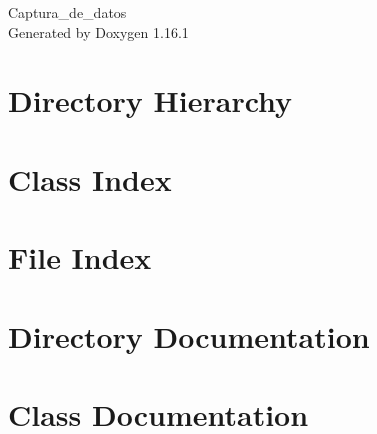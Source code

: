 \documentclass[twoside]{book}
\newcommand{\+}{\discretionary{\mbox{\scriptsize$\hookleftarrow$}}{}{}}
\newcommand{\clearemptydoublepage}{%
    \newpage{\pagestyle{empty}\cleardoublepage}%
  }
\begin{document}
  \raggedbottom
    \hypersetup{pageanchor=false,
                bookmarksnumbered=true,
                pdfencoding=unicode
               }
  \begin{titlepage}
  \vspace*{7cm}
  \begin{center}%
  {\Large Captura\+\_\+de\+\_\+datos}\\
  \vspace*{1cm}
  {\large Generated by Doxygen 1.16.1}\\
  \end{center}
  \end{titlepage}
  \clearemptydoublepage
  \tableofcontents
  \clearemptydoublepage
  \hypersetup{pageanchor=true}
\chapter{Directory Hierarchy}

\chapter{Class Index}

\chapter{File Index}

\chapter{Directory Documentation}



\chapter{Class Documentation}









\end{document}
